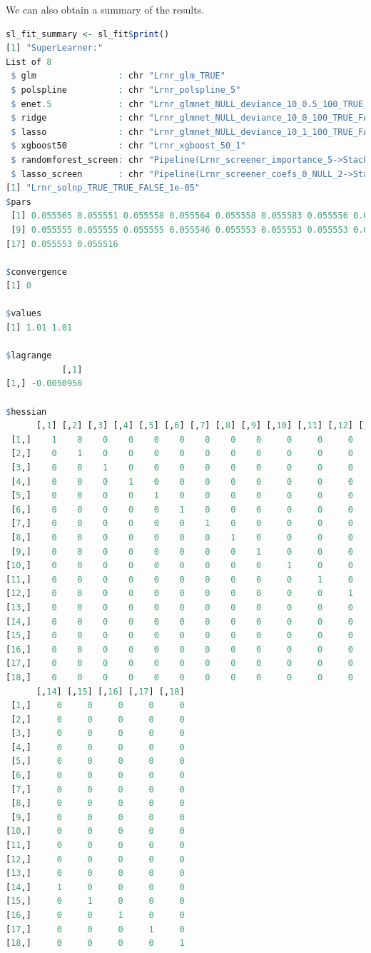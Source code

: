 \documentclass[12pt, krantz2,]{krantz}
\theoremstyle{definition}
\theoremstyle{definition}
\theoremstyle{definition}
\newcommand{\1}{\mathbbm{1}}
\begin{document}
We can also obtain a summary of the results.

\begin{lstlisting}[language=R]
sl_fit_summary <- sl_fit$print()
[1] "SuperLearner:"
List of 8
 $ glm                : chr "Lrnr_glm_TRUE"
 $ polspline          : chr "Lrnr_polspline_5"
 $ enet.5             : chr "Lrnr_glmnet_NULL_deviance_10_0.5_100_TRUE_FALSE"
 $ ridge              : chr "Lrnr_glmnet_NULL_deviance_10_0_100_TRUE_FALSE"
 $ lasso              : chr "Lrnr_glmnet_NULL_deviance_10_1_100_TRUE_FALSE"
 $ xgboost50          : chr "Lrnr_xgboost_50_1"
 $ randomforest_screen: chr "Pipeline(Lrnr_screener_importance_5->Stack)"
 $ lasso_screen       : chr "Pipeline(Lrnr_screener_coefs_0_NULL_2->Stack)"
[1] "Lrnr_solnp_TRUE_TRUE_FALSE_1e-05"
$pars
 [1] 0.055565 0.055551 0.055558 0.055564 0.055558 0.055583 0.055556 0.055573
 [9] 0.055555 0.055555 0.055555 0.055546 0.055553 0.055553 0.055553 0.055552
[17] 0.055553 0.055516

$convergence
[1] 0

$values
[1] 1.01 1.01

$lagrange
           [,1]
[1,] -0.0050956

$hessian
      [,1] [,2] [,3] [,4] [,5] [,6] [,7] [,8] [,9] [,10] [,11] [,12] [,13]
 [1,]    1    0    0    0    0    0    0    0    0     0     0     0     0
 [2,]    0    1    0    0    0    0    0    0    0     0     0     0     0
 [3,]    0    0    1    0    0    0    0    0    0     0     0     0     0
 [4,]    0    0    0    1    0    0    0    0    0     0     0     0     0
 [5,]    0    0    0    0    1    0    0    0    0     0     0     0     0
 [6,]    0    0    0    0    0    1    0    0    0     0     0     0     0
 [7,]    0    0    0    0    0    0    1    0    0     0     0     0     0
 [8,]    0    0    0    0    0    0    0    1    0     0     0     0     0
 [9,]    0    0    0    0    0    0    0    0    1     0     0     0     0
[10,]    0    0    0    0    0    0    0    0    0     1     0     0     0
[11,]    0    0    0    0    0    0    0    0    0     0     1     0     0
[12,]    0    0    0    0    0    0    0    0    0     0     0     1     0
[13,]    0    0    0    0    0    0    0    0    0     0     0     0     1
[14,]    0    0    0    0    0    0    0    0    0     0     0     0     0
[15,]    0    0    0    0    0    0    0    0    0     0     0     0     0
[16,]    0    0    0    0    0    0    0    0    0     0     0     0     0
[17,]    0    0    0    0    0    0    0    0    0     0     0     0     0
[18,]    0    0    0    0    0    0    0    0    0     0     0     0     0
      [,14] [,15] [,16] [,17] [,18]
 [1,]     0     0     0     0     0
 [2,]     0     0     0     0     0
 [3,]     0     0     0     0     0
 [4,]     0     0     0     0     0
 [5,]     0     0     0     0     0
 [6,]     0     0     0     0     0
 [7,]     0     0     0     0     0
 [8,]     0     0     0     0     0
 [9,]     0     0     0     0     0
[10,]     0     0     0     0     0
[11,]     0     0     0     0     0
[12,]     0     0     0     0     0
[13,]     0     0     0     0     0
[14,]     1     0     0     0     0
[15,]     0     1     0     0     0
[16,]     0     0     1     0     0
[17,]     0     0     0     1     0
[18,]     0     0     0     0     1


\end{lstlisting}
\end{document}
